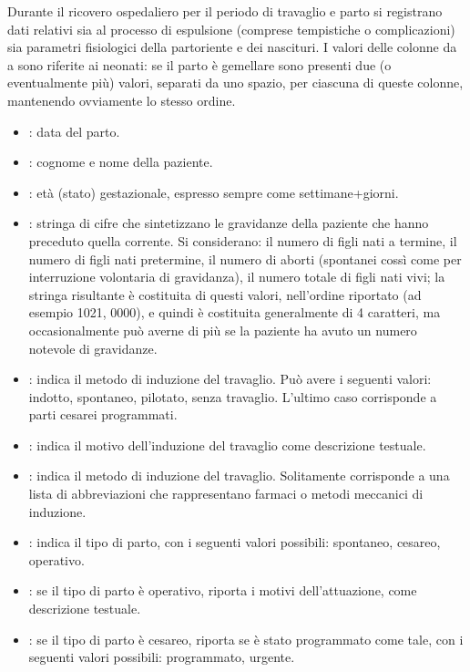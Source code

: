 Durante il ricovero ospedaliero per il periodo di travaglio e parto si registrano dati relativi sia al processo di espulsione (comprese tempistiche o complicazioni) sia parametri fisiologici della partoriente e dei nascituri.
I valori delle colonne da  a  sono riferite ai neonati: se il parto è gemellare sono presenti due (o eventualmente più) valori, separati da uno spazio, per ciascuna di queste colonne, mantenendo ovviamente lo stesso ordine.

\begin{itemize}
\item {}: data del parto.
\item {}: cognome e nome della paziente.
\item {}: età (stato) gestazionale, espresso sempre come settimane+giorni.
\item {}: stringa di cifre che sintetizzano le gravidanze della paziente che hanno preceduto quella corrente.
Si considerano: il numero di figli nati a termine, il numero di figli nati pretermine, il numero di aborti (spontanei cossì come per interruzione volontaria di gravidanza), il numero totale di figli nati vivi; la stringa risultante è costituita di questi valori, nell'ordine riportato (ad esempio 1021, 0000), e quindi è costituita generalmente di 4 caratteri, ma occasionalmente può averne di più se la paziente ha avuto un numero notevole di gravidanze.
\item {}: indica il metodo di induzione del travaglio. Può avere i seguenti valori: indotto, spontaneo, pilotato, senza travaglio. L'ultimo caso corrisponde a parti cesarei programmati.
\item {}: indica il motivo dell'induzione del travaglio come descrizione testuale.
\item {}: indica il metodo di induzione del travaglio. Solitamente corrisponde a una lista di abbreviazioni che rappresentano farmaci o metodi meccanici di induzione.
\item {}: indica il tipo di parto, con i seguenti valori possibili: spontaneo, cesareo, operativo.
\item {}: se il tipo di parto è operativo, riporta i motivi dell'attuazione, come descrizione testuale.
\item {}: se il tipo di parto è cesareo, riporta se è stato programmato come tale, con i seguenti valori possibili: programmato, urgente.

\end{itemize}
